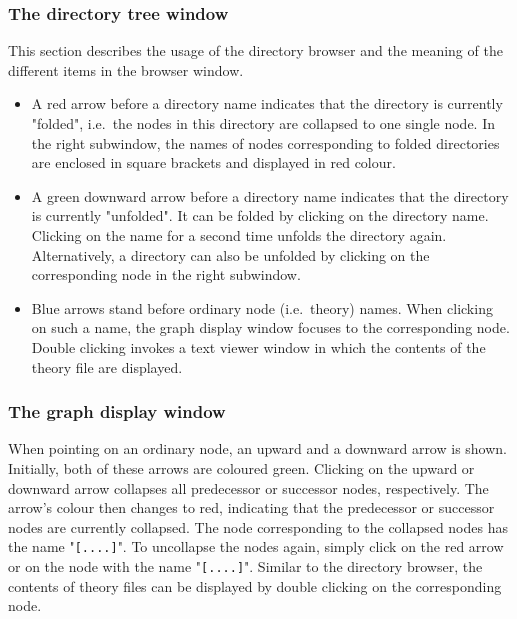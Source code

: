 \subsubsection*{The directory tree window}
This section describes the usage of the directory browser and the
meaning of the different items in the browser window.
\begin{itemize}
\item A red arrow before a directory name indicates that the directory is
currently "folded", i.e.~the nodes in this directory
are collapsed to one single node. In the right subwindow, the names of
nodes corresponding to folded directories are enclosed in square brackets
and displayed in red colour.
\item A green downward arrow before a directory name indicates that the
directory is currently "unfolded". It can be folded by clicking on the
directory name.
Clicking on the name for a second time unfolds the directory again.
Alternatively, a directory can also be unfolded by clicking on the
corresponding node in the right subwindow.
\item Blue arrows stand before ordinary node (i.e.~theory) names. When
clicking on such a name, the graph display window focuses to the
corresponding node. Double clicking invokes a text viewer window in
which the contents of the theory file are displayed.
\end{itemize}

\subsubsection*{The graph display window}
When pointing on an ordinary node, an upward and a downward arrow is shown.
Initially, both of these arrows are coloured green. Clicking on the
upward or downward arrow collapses all predecessor or successor nodes,
respectively. The arrow's colour then changes to red, indicating that
the predecessor or successor nodes are currently collapsed. The node
corresponding to the collapsed nodes has the name "{\tt [....]}". To
uncollapse the nodes again, simply click on the red arrow or on the node
with the name "{\tt [....]}". Similar to the directory browser, the contents
of theory files can be displayed by double clicking on the corresponding
node. 

